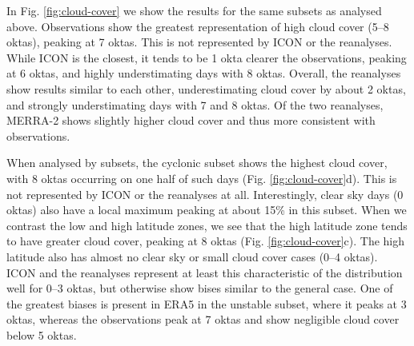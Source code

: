 \documentclass[12pt,a4paper]{article}
\begin{document}
In Fig.  \ref{fig:cloud-cover} we show the results for the same subsets as
analysed above. Observations show the greatest representation of high cloud
cover (5--8 oktas), peaking at 7 oktas. This is not represented by ICON or the
reanalyses.  While ICON is the closest, it tends to be 1 okta clearer the
observations, peaking at 6 oktas, and highly understimating days with 8 oktas.
Overall, the reanalyses show results similar to each other, underestimating
cloud cover by about 2 oktas, and strongly understimating days with 7 and 8
oktas. Of the two reanalyses, MERRA-2 shows slightly higher cloud cover and
thus more consistent with observations.

When analysed by subsets, the cyclonic subset shows the highest cloud cover,
with 8 oktas occurring on one half of such days (Fig. \ref{fig:cloud-cover}d).
This is not represented by ICON or the reanalyses at all. Interestingly, clear
sky days (0 oktas) also have a local maximum peaking at about 15\% in this
subset.  When we contrast the low and high latitude zones, we see that the high
latitude zone tends to have greater cloud cover, peaking at 8 oktas (Fig.
\ref{fig:cloud-cover}c). The high latitude also has almost no clear sky or
small cloud cover cases (0--4 oktas). ICON and the reanalyses represent at
least this characteristic of the distribution well for 0--3 oktas, but
otherwise show bises similar to the general case. One of the greatest biases is
present in ERA5 in the unstable subset, where it peaks at 3 oktas, whereas the
observations peak at 7 oktas and show negligible cloud cover below 5 oktas.
\end{document}
